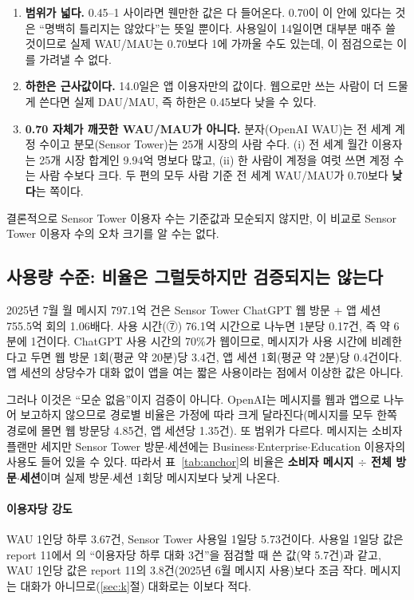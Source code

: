 \documentclass[11pt]{article}
\begin{document}
\begin{enumerate}[label=(\arabic*)]
  \item \textbf{범위가 넓다.} 0.45--1 사이라면 웬만한 값은 다 들어온다. 0.70이 이 안에 있다는 것은 ``명백히 틀리지는 않았다''는 뜻일 뿐이다. 사용일이 14일이면 대부분 매주 쓸 것이므로 실제 WAU/MAU는 0.70보다 1에 가까울 수도 있는데, 이 점검으로는 이를 가려낼 수 없다.
  \item \textbf{하한은 근사값이다.} 14.0일은 앱 이용자만의 값이다. 웹으로만 쓰는 사람이 더 드물게 쓴다면 실제 DAU/MAU, 즉 하한은 0.45보다 낮을 수 있다.
  \item \textbf{0.70 자체가 깨끗한 WAU/MAU가 아니다.} 분자(OpenAI WAU)는 전 세계 계정 수이고 분모(Sensor Tower)는 25개 시장의 사람 수다. (i) 전 세계 월간 이용자는 25개 시장 합계인 9.94억 명보다 많고, (ii) 한 사람이 계정을 여럿 쓰면 계정 수는 사람 수보다 크다. 두 편의 모두 사람 기준 전 세계 WAU/MAU가 0.70보다 \textbf{낮다}는 쪽이다.
\end{enumerate}

결론적으로 Sensor Tower 이용자 수는 기준값과 모순되지 않지만, 이 비교로 Sensor Tower 이용자 수의 오차 크기를 알 수는 없다.

\subsection{사용량 수준: 비율은 그럴듯하지만 검증되지는 않는다}

2025년 7월 월 메시지 797.1억 건은 Sensor Tower ChatGPT 웹 방문 + 앱 세션 755.5억 회의 1.06배다. 사용 시간(⑦) 76.1억 시간으로 나누면 1분당 0.17건, 즉 약 6분에 1건이다. ChatGPT 사용 시간의 70\%가 웹이므로, 메시지가 사용 시간에 비례한다고 두면 웹 방문 1회(평균 약 20분)당 3.4건, 앱 세션 1회(평균 약 2분)당 0.4건이다. 앱 세션의 상당수가 대화 없이 앱을 여는 짧은 사용이라는 점에서 이상한 값은 아니다.

그러나 이것은 ``모순 없음''이지 검증이 아니다. OpenAI는 메시지를 웹과 앱으로 나누어 보고하지 않으므로 경로별 비율은 가정에 따라 크게 달라진다(메시지를 모두 한쪽 경로에 몰면 웹 방문당 4.85건, 앱 세션당 1.35건). 또 범위가 다르다. 메시지는 소비자 플랜만 세지만 Sensor Tower 방문$\cdot$세션에는 Business$\cdot$Enterprise$\cdot$Education 이용자의 사용도 들어 있을 수 있다. 따라서 표~\ref{tab:anchor}의 비율은 \textbf{소비자 메시지 $\div$ 전체 방문$\cdot$세션}이며 실제 방문$\cdot$세션 1회당 메시지보다 낮게 나온다.

\paragraph{이용자당 강도} WAU 1인당 하루 3.67건, Sensor Tower 사용일 1일당 5.73건이다. 사용일 1일당 값은 report 11에서 \textcite{fan-2026-aggregate-gains-from-ai}의 ``이용자당 하루 대화 3건''을 점검할 때 쓴 값(약 5.7건)과 같고, WAU 1인당 값은 report 11의 3.8건(2025년 6월 메시지 사용)보다 조금 작다. 메시지는 대화가 아니므로(\ref{sec:k}절) 대화로는 이보다 적다.
\end{document}
